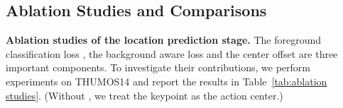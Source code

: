 \documentclass[final]{cvpr}
\begin{document}
\begin{table}[t]
\small
\begin{center}
\caption{Comparison on GTEA and BEOID. AVG denotes the average mAP at IoU thresholds 0.1:0.1:0.7.}
\label{tab:GTEA and BEOID}
\end{center}
\vspace{-5pt}
\end{table}







\subsection{Ablation Studies and Comparisons}
\textbf{Ablation studies of the location prediction stage.}   \label{sec:Ablation Studies}
The foreground classification loss , the background aware loss  and the center offset  are three important components. To investigate their contributions, we perform experiments on THUMOS14 and report the results in Table~\ref{tab:ablation studies}. (Without , we treat the keypoint as the action center.)
\end{document}
